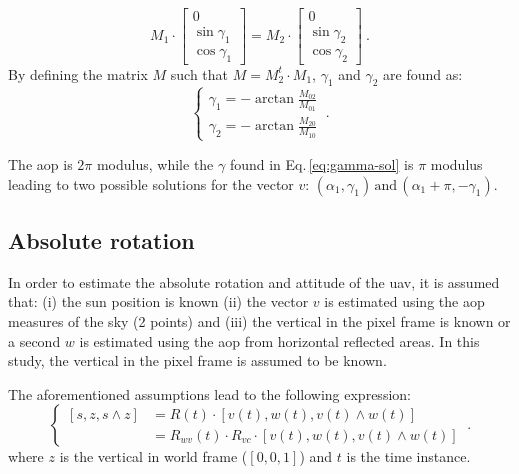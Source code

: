 \begin{equation}
  M_{1}\cdot
  \begin{bmatrix}
0\\
\sin\gamma_{1}\\
\cos\gamma_{1}
\end{bmatrix}
=M_{2}\cdot
\begin{bmatrix}
0\\
\sin\gamma_{2}\\
\cos\gamma_{2}
\end{bmatrix} \ .
\label{eq:2pts}
\end{equation}
By defining the matrix $M$ such that $M=M_{2}^{t}\cdot M_{1}$, $\gamma_1$ and
$\gamma_2$ are found as:
\begin{equation}
\begin{cases}
\gamma_{1}=-\arctan\frac{M_{02}}{M_{01}}\\
\gamma_{2}=-\arctan\frac{M_{20}}{M_{10}}
\end{cases} \ .
\label{eq:gamma-sol}
\end{equation}

The \gls{aop} is $2\pi$ modulus, while the $\gamma$ found in
Eq.\,\eqref{eq:gamma-sol} is $\pi$ modulus leading to two possible solutions
for the vector $v$: 
$\left(\alpha_{1},\gamma_{1}\right)\,\text{and}\,\left(\alpha_{1}+\pi,-\gamma_{1}\right)$.

\subsection{Absolute rotation}
\label{sec:abs-rot}
In order to estimate the absolute rotation and attitude of the \gls{uav}, it is
assumed that: (i) the sun position is known (ii) the vector $v$ is estimated
using the \gls{aop} measures of the sky (2 points) and (iii) the vertical in
the pixel frame is known or a second $w$ is estimated using the \gls{aop} from
horizontal reflected areas. In this study, the vertical in the pixel frame is
assumed to be known.

The aforementioned assumptions lead to the following expression:
\begin{equation}
\begin{cases}
\left[s,z,s\wedge z\right] & =R(t)\cdot\left[v(t),w(t),v(t)\wedge w(t)\right]\\
 & =R_{wv}(t)\cdot R_{vc}\cdot\left[v(t),w(t),v(t)\wedge w(t)\right]
\end{cases} \ .
\label{eq:linear_equation}
\end{equation}
\noindent where $z$ is the vertical in world frame ($[0, 0, 1]$) and $t$ is the
time instance.

